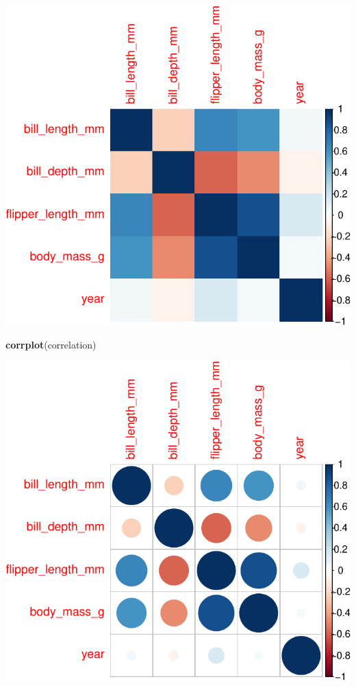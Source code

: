 \documentclass[
]{article}
\newenvironment{Shaded}{\begin{snugshade}}{\end{snugshade}}
\newcommand{\KeywordTok}[1]{\textcolor[rgb]{0.13,0.29,0.53}{\textbf{#1}}}
\newcommand{\NormalTok}[1]{#1}
\begin{document}
\includegraphics{es_files/figure-latex/unnamed-chunk-21-1.pdf}

\begin{Shaded}
\begin{Highlighting}[]
\KeywordTok{corrplot}\NormalTok{(correlation)}
\end{Highlighting}
\end{Shaded}

\includegraphics{es_files/figure-latex/unnamed-chunk-22-1.pdf}
\end{document}

